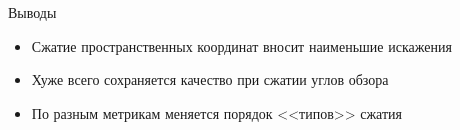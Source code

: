 \documentclass{beamer}
\begin{document}
\begin{frame}{Выводы}
\begin{itemize}
  \item Сжатие пространственных координат вносит наименьшие искажения
  \item Хуже всего сохраняется качество при сжатии углов обзора
  \item По разным метрикам меняется порядок <<типов>> сжатия
\end{itemize}
\end{frame}
\end{document}
